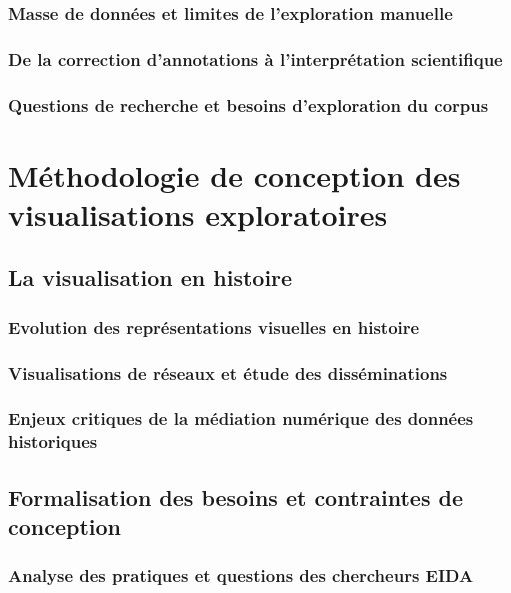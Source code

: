 \documentclass[a4paper,12pt,twoside]{book}
\newcommand{\clearemptydoublepage}{\newpage{\pagestyle{empty}\cleardoublepage}}
\begin{document}
	\section{Masse de données et limites de l'exploration manuelle}

	\section{De la correction d'annotations à l'interprétation scientifique}

	\section{Questions de recherche et besoins d'exploration du corpus}

	\clearemptydoublepage

	\part{Méthodologie de conception des visualisations exploratoires}
	\chapter{La visualisation en histoire}
	\section{Evolution des représentations visuelles en histoire}

	\section{Visualisations de réseaux et étude des disséminations}

	\section{Enjeux critiques de la médiation numérique des données historiques}

	\clearemptydoublepage

	\chapter{Formalisation des besoins et contraintes de conception}
	\section{Analyse des pratiques et questions des chercheurs EIDA}
\end{document}
